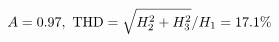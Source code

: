 \documentclass[preview]{standalone}
\begin{document}
\begin{align*}
\special{dvisvgm:raw <g id='unique000'>}A=0.97,\ \text{THD}=\sqrt{H_2^2+H_3^2}/H_1=17.1\%\special{dvisvgm:raw </g>}
\end{align*}
\end{document}
